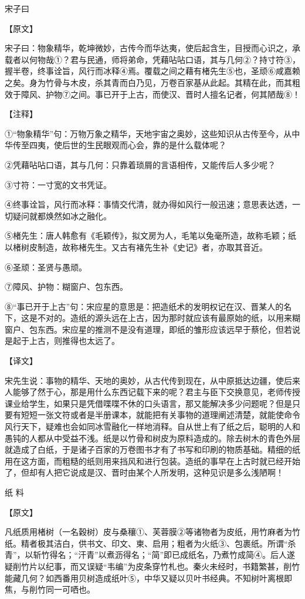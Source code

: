 \documentclass[12pt,UTF8]{ctexbook}
\begin{document}
宋子曰

【原文】

宋子曰：物象精华，乾坤微妙，古传今而华达夷，使后起含生，目授而心识之，承载者以何物哉①？君与民通，师将弟命，凭藉呫呫口语，其与几何②？持寸符③，握半卷，终事诠旨，风行而冰释④焉。覆载之间之藉有楮先生⑤也，圣顽⑥咸嘉赖之矣。身为竹骨与木皮，杀其青而白乃见，万卷百家基从此起。其精在此，而其粗效于障风、护物⑦之间。事已开于上古，而使汉、晋时人擅名记者，何其陋哉⑧！

【注释】

①“物象精华”句：万物万象之精华，天地宇宙之奥妙，这些知识从古传至今，从中华传至四夷，使后世的生民眼观而心会，靠的是什么载体呢？

②凭藉呫呫口语，其与几何：只靠着琐屑的言语相传，又能传后人多少呢？

③寸符：一寸宽的文书凭证。

④终事诠旨，风行而冰释：事情交代清，就办得如风行一般迅速；意思表达透，一切疑问就都焕然如冰之融化。

⑤楮先生：唐人韩愈有《毛颖传》，拟文房为人，毛笔以兔毫所造，故称毛颖；纸以楮树皮制造，故称楮先生。又古有褚先生补《史记》者，亦取其音近。

⑥圣顽：圣贤与愚顽。

⑦障风、护物：糊窗户、包东西。

⑧“事已开于上古”句：宋应星的意思是：把造纸术的发明权记在汉、晋某人的名下，这是不对的。造纸的源头远在上古，因为那时就应该有最原始的纸，以用来糊窗户、包东西。宋应星的推测不是没有道理，即纸的雏形应该远早于蔡伦，但若说是起于上古，则推得也太远了。

【译文】

宋先生说：事物的精华、天地的奥妙，从古代传到现在，从中原抵达边疆，使后来人能够了然于心，那是用什么东西记载下来的呢？君主与臣下交换意见，老师传授课业给学生，如果只是凭借喋喋不休的口头语言，那又能解决多少问题呢？但是只要有短短一张文符或者是半册课本，就能把有关事物的道理阐述清楚，就能使命令风行天下，疑难也会如同冰雪融化一样地消释。自从世上有了纸之后，聪明的人和愚钝的人都从中受益不浅。纸是以竹骨和树皮为原料造成的。除去树木的青色外层就造成了白纸，于是诸子百家的万卷图书才有了书写和印刷的物质基础。精细的纸用在这方面，而粗糙的纸则用来挡风和进行包装。造纸的事早在上古时就已经开始了，但却有人把它说成是汉、晋时由某个人所发明，这种见识是多么浅陋啊！

纸 料

【原文】

凡纸质用楮树（一名穀树）皮与桑穰①、芙蓉膜②等诸物者为皮纸，用竹麻者为竹纸。精者极其洁白，供书文、印文、柬、启用；粗者为火纸③、包裹纸。所谓“杀青”，以斩竹得名；“汗青”以煮沥得名；“简”即已成纸名，乃煮竹成简④。后人遂疑削竹片以纪事，而又误疑“韦编”为皮条穿竹札也。秦火未经时，书籍繁甚，削竹能藏几何？如西番用贝树造成纸叶⑤，中华又疑以贝叶书经典。不知树叶离根即焦，与削竹同一可哂也。
\end{document}
